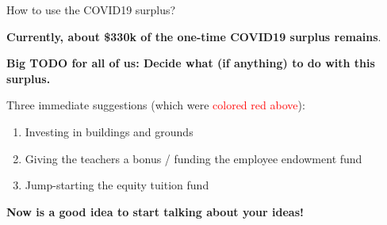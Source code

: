 \documentclass[8pt]{beamer}
\begin{document}

\begin{frame}{How to use the COVID19 surplus?}

\textbf{Currently, about \$330k of the one-time COVID19 surplus remains}.

\textbf{Big TODO for all of us: Decide what (if
anything) to do with this surplus.}

Three immediate suggestions (which were \textcolor{red}{colored red above}):
%
\begin{enumerate}
%
\item Investing in buildings and grounds
\item Giving the teachers a bonus / funding the employee endowment fund
\item Jump-starting the equity tuition fund
%
\end{enumerate}
%
\textbf{Now is a good idea to start talking about your ideas!}


\end{frame}
\end{document}
